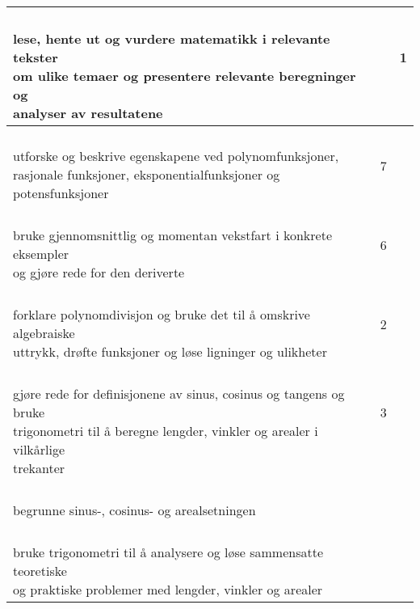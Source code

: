 \documentclass{article}
\begin{document}
\begin{center}
\begin{tabular}{p{10.5cm} | c | c |}
	\shortstack[l]{\\ lese, hente ut og vurdere matematikk i relevante tekster\\ om ulike temaer og presentere relevante beregninger og\\ analyser av resultatene
	} &\shortstack{} &\shortstack{1\\{}\\{}} \\ \hline		

	\shortstack[l]{\\ utforske og beskrive egenskapene ved polynomfunksjoner,\\ rasjonale funksjoner, eksponentialfunksjoner og potensfunksjoner
	} &\shortstack{7\\{}} &\shortstack{\\{}\\{}} \\ \hline

	\shortstack[l]{\\ bruke gjennomsnittlig og momentan vekstfart i konkrete eksempler \\og gjøre rede for den deriverte
	} &\shortstack{6\\{}} &\shortstack{\\{}\\{}} \\ \hline

	\shortstack[l]{\\ forklare polynomdivisjon og bruke det til å omskrive algebraiske \\uttrykk, drøfte funksjoner og løse ligninger og ulikheter
	} &\shortstack{2\\{}} &\shortstack{\\{}\\{}} \\ \hline

	\shortstack[l]{\\ gjøre rede for definisjonene av sinus, cosinus og tangens og bruke \\ trigonometri til å beregne lengder, vinkler og arealer i vilkårlige\\ trekanter
	} &\shortstack{3\\{}\\{}} &\shortstack{\\{}\\{}} \\ \hline

	\shortstack[l]{\\ begrunne sinus-, cosinus- og arealsetningen
	} &\shortstack{3} &\shortstack{} \\ \hline

	\shortstack[l]{\\ bruke trigonometri til å analysere og løse sammensatte teoretiske \\og praktiske problemer med lengder, vinkler og arealer
	} &\shortstack{3} &\shortstack{} \\ \hline
	\end{tabular}
\end{center} \vspace{20pt}
\end{document}
